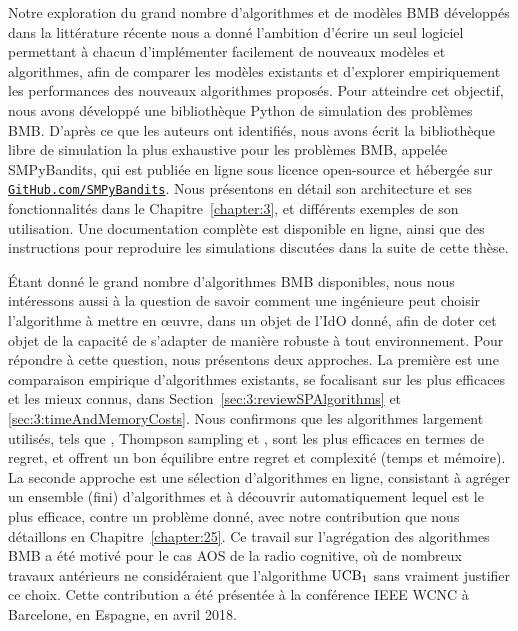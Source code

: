 \begin{resume_fr}
%
Notre exploration du grand nombre d'algorithmes et de modèles BMB développés dans la littérature récente
nous a donné l'ambition d'écrire un seul logiciel permettant à chacun d'implémenter facilement de nouveaux modèles et algorithmes, afin de comparer les modèles existants et d'explorer empiriquement les performances des nouveaux algorithmes proposés.
Pour atteindre cet objectif, nous avons développé une bibliothèque Python de simulation des problèmes BMB.
%
D'après ce que les auteurs ont identifiés,
nous avons écrit la bibliothèque libre de simulation la plus exhaustive pour les problèmes BMB, appelée SMPyBandits, qui est publiée en ligne sous licence open-source \cite{SMPyBanditsJMLR,SMPyBandits} et hébergée sur \href{https://GitHub.com/SMPyBandits}{\texttt{GitHub.com/SMPyBandits}}.
Nous présentons en détail son architecture et ses fonctionnalités dans le Chapitre~\ref{chapter:3}, et différents exemples de son utilisation.
Une documentation complète est disponible en ligne, ainsi que des instructions pour reproduire les simulations discutées dans la suite de cette thèse.


%
Étant donné le grand nombre d'algorithmes BMB disponibles, nous nous intéressons aussi à la question de savoir comment une ingénieure peut choisir l'algorithme à mettre en œuvre, dans un objet de l'IdO donné, afin de doter cet objet de la capacité de s'adapter de manière robuste à tout environnement.
Pour répondre à cette question, nous présentons deux approches.
La première est une comparaison empirique d'algorithmes existants, se focalisant sur les plus efficaces et les mieux connus, dans Section~\ref{sec:3:reviewSPAlgorithms} et \ref{sec:3:timeAndMemoryCosts}.
Nous confirmons que les algorithmes largement utilisés, tels que \UCB{} \cite{Auer02}, Thompson sampling \cite{Thompson33} et \klUCB{} \cite{KLUCBJournal}, sont les plus efficaces en termes de regret, et offrent un bon équilibre entre regret et complexité (temps et mémoire).
La seconde approche est une sélection d'algorithmes en ligne, consistant à agréger un ensemble (fini) d'algorithmes et à découvrir automatiquement lequel est le plus efficace, contre un problème donné, avec notre contribution \Aggr{} que nous détaillons en Chapitre~\ref{chapter:25}.
Ce travail sur l'agrégation des algorithmes BMB a été motivé pour le cas AOS de la radio cognitive, où de nombreux travaux antérieurs ne considéraient que l'algorithme $\mathrm{UCB}_1$ sans vraiment justifier ce choix.
Cette contribution a été présentée à la conférence IEEE WCNC à Barcelone, en Espagne, en avril 2018.



\end{resume_fr}
